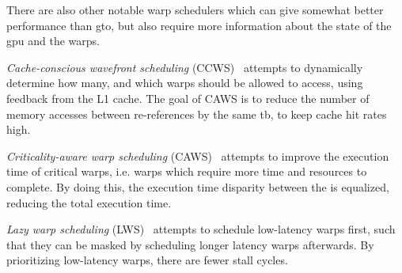 There are also other notable warp schedulers which can give somewhat better performance than \acrshort{gto}, but also require more information about the state of the \acrshort{gpu} and the warps.

\textit{Cache-conscious wavefront scheduling} (CCWS)~\cite{cache-conscious_wavefront_scheduling} attempts to dynamically determine how many, and which warps should be allowed to access, using feedback from the L1 cache. The goal of CAWS is to reduce the number of memory accesses between re-references by the same \acrshort{tb}, to keep cache hit rates high.

\textit{Criticality-aware warp scheduling} (CAWS)~\cite{caws} attempts to improve the execution time of critical warps, i.e. warps which require more time and resources to complete. By doing this, the execution time disparity between the  is equalized, reducing the total execution time.

\textit{Lazy warp scheduling} (LWS)~\cite{improving_gpgpu_scheduling} attempts to schedule low-latency warps first, such that they can be masked by scheduling longer latency warps afterwards. By prioritizing low-latency warps, there are fewer stall cycles.

